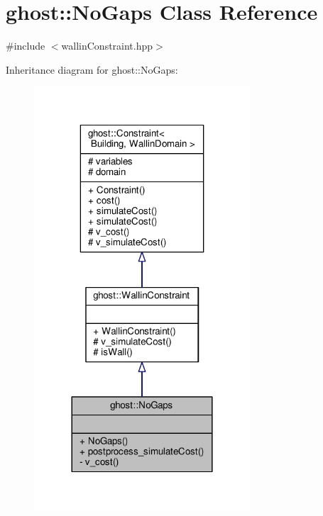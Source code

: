 \hypertarget{classghost_1_1NoGaps}{\section{ghost\-:\-:No\-Gaps Class Reference}
\label{classghost_1_1NoGaps}
}


{\ttfamily \#include $<$wallin\-Constraint.\-hpp$>$}



Inheritance diagram for ghost\-:\-:No\-Gaps\-:
\nopagebreak
\begin{figure}[H]
\begin{center}
\leavevmode
\includegraphics[width=228pt]{classghost_1_1NoGaps__inherit__graph}
\end{center}
\end{figure}


